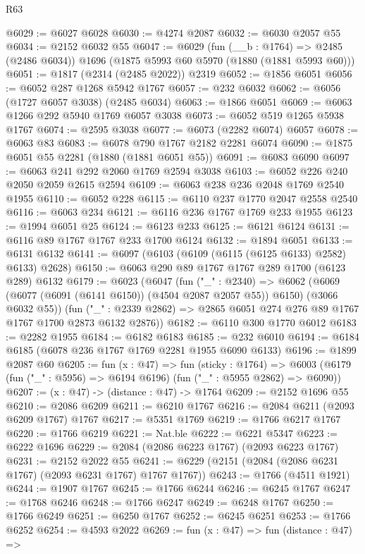 \begin{lexlean}{R63}
\begin{coremodule}
@6029 := @6027 @6028
@6030 := @4274 @2087
@6032 := @6030 @2057 @55
@6034 := @2152 @6032 @55
@6047 := @6029
    (fun (__b : @1764) => @2485 (@2486 @6034))
    @1696
    (@1875 @5993 @60 @5970 (@1880 (@1881 @5993 @60)))
@6051 := @1817 (@2314 (@2485 @2022)) @2319
@6052 := @1856 @6051
@6056 := @6052 @287 @1268 @5942 @1767
@6057 := @232 @6032
@6062 := @6056 (@1727 @6057 @3038) (@2485 @6034)
@6063 := @1866 @6051
@6069 := @6063 @1266 @292 @5940 @1769 @6057 @3038
@6073 := @6052 @519 @1265 @5938 @1767
@6074 := @2595 @3038
@6077 := @6073 (@2282 @6074) @6057
@6078 := @6063 @83
@6083 := @6078 @790 @1767 @2182 @2281 @6074
@6090 := @1875 @6051 @55 @2281 (@1880 (@1881 @6051 @55))
@6091 := @6083 @6090
@6097 := @6063 @241 @292 @2060 @1769 @2594 @3038
@6103 := @6052 @226 @240 @2050 @2059 @2615 @2594
@6109 := @6063 @238 @236 @2048 @1769 @2540 @1955
@6110 := @6052 @228
@6115 := @6110 @237 @1770 @2047 @2558 @2540
@6116 := @6063 @234
@6121 := @6116 @236 @1767 @1769 @233 @1955
@6123 := @1994 @6051 @25
@6124 := @6123 @233
@6125 := @6121 @6124
@6131 := @6116 @89 @1767 @1767 @233 @1700 @6124
@6132 := @1894 @6051
@6133 := @6131 @6132
@6141 := @6097 (@6103 (@6109 (@6115 (@6125 @6133) @2582) @6133) @2628)
@6150 := @6063 @290 @89 @1767 @1767 @289 @1700 (@6123 @289) @6132
@6179 := @6023
    (@6047
      (fun ("_" : @2340) =>
      @6062 (@6069 (@6077 (@6091 (@6141 @6150)) (@4504 @2087 @2057 @55)) @6150) (@3066 @6032 @55))
      (fun ("_" : @2339 @2862) => @2865 @6051 @274 @276 @89 @1767 @1767 @1700 @2873 @6132 @2876))
@6182 := @6110 @300 @1770 @6012
@6183 := @2282 @1955
@6184 := @6182 @6183
@6185 := @232 @6010
@6194 := @6184 @6185 (@6078 @236 @1767 @1769 @2281 @1955 @6090 @6133)
@6196 := @1899 @2087 @60
@6205 := fun (x : @47) =>
  fun (sticky : @1764) =>
  @6003 (@6179 (fun ("_" : @5956) => @6194 @6196) (fun ("_" : @5955 @2862) => @6090))
@6207 := (x : @47) -> (distance : @47) -> @1764
@6209 := @2152 @1696 @55
@6210 := @2086 @6209
@6211 := @6210 @1767
@6216 := @2084 @6211 (@2093 @6209 @1767) @1767
@6217 := @5351 @1769
@6219 := @1766 @6217 @1767
@6220 := @1766 @6219
@6221 := Nat.ble
@6222 := @6221 @5347
@6223 := @6222 @1696
@6229 := @2084 (@2086 @6223 @1767) (@2093 @6223 @1767)
@6231 := @2152 @2022 @55
@6241 := @6229 (@2151 (@2084 (@2086 @6231 @1767) (@2093 @6231 @1767) @1767 @1767))
@6243 := @1766 (@4511 @1921)
@6244 := @1907 @1767
@6245 := @1766 @6244
@6246 := @6245 @1767
@6247 := @1768 @6246
@6248 := @1766 @6247
@6249 := @6248 @1767
@6250 := @1766 @6249
@6251 := @6250 @1767
@6252 := @6245 @6251
@6253 := @1766 @6252
@6254 := @4593 @2022
@6269 := fun (x : @47) =>
  fun (distance : @47) =>

\end{coremodule}
\end{lexlean}
